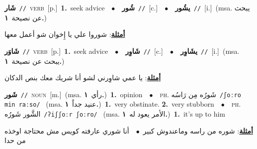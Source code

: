\documentclass[10pt,a4paper,twoside]{article} %
\begin{document}
\begin{multicols}{2}
{\setlength\topsep{0pt}\textbf{\foreignlanguage{arabic}{شَار}}\ {\color{gray}\texttt{//}\color{black}}\ \textsc{verb}\ [p.]\ \textbf{1.}~seek advice\ \ $\bullet$\ \ \setlength\topsep{0pt}\textbf{\foreignlanguage{arabic}{شُور}}\ {\color{gray}\texttt{//}\color{black}}\ [c.]\ \ $\bullet$\ \ \setlength\topsep{0pt}\textbf{\foreignlanguage{arabic}{يشُور}}\ {\color{gray}\texttt{//}\color{black}}\ [i.]\ \color{gray}(msa. \foreignlanguage{arabic}{يبحث عن نصيحة}~\foreignlanguage{arabic}{\textbf{١.}})\color{black}\  \begin{flushright}\color{gray}\foreignlanguage{arabic}{\textbf{\underline{\foreignlanguage{arabic}{أمثلة}}}: شوروا علي يا إِخوان شو أعمل معها}\end{flushright}\color{black}} \vspace{2mm}

{\setlength\topsep{0pt}\textbf{\foreignlanguage{arabic}{شَاوَر}}\ {\color{gray}\texttt{//}\color{black}}\ \textsc{verb}\ [p.]\ \textbf{1.}~seek advice\ \ $\bullet$\ \ \setlength\topsep{0pt}\textbf{\foreignlanguage{arabic}{شَاوِر}}\ {\color{gray}\texttt{//}\color{black}}\ [c.]\ \ $\bullet$\ \ \setlength\topsep{0pt}\textbf{\foreignlanguage{arabic}{يشَاوِر}}\ {\color{gray}\texttt{//}\color{black}}\ [i.]\ \color{gray}(msa. \foreignlanguage{arabic}{يبحث عن نصيحة}~\foreignlanguage{arabic}{\textbf{١.}})\color{black}\  \begin{flushright}\color{gray}\foreignlanguage{arabic}{\textbf{\underline{\foreignlanguage{arabic}{أمثلة}}}: يا عمي شاوِرني لشو أنا شريك معك بنص الدكان}\end{flushright}\color{black}} \vspace{2mm}

{\setlength\topsep{0pt}\textbf{\foreignlanguage{arabic}{شَور}}\ {\color{gray}\texttt{//}\color{black}}\ \textsc{noun}\ [m.]\ \color{gray}(msa. \foreignlanguage{arabic}{رأي}~\foreignlanguage{arabic}{\textbf{١.}})\color{black}\ \textbf{1.}~opinion\ \ $\bullet$\ \ \textsc{ph.} \color{gray} \foreignlanguage{arabic}{شَورُه مِن رَاسُه}\color{black}\ {\color{gray}\texttt{/{\sffamily ʃoːro min raːso}/}\color{black}}\ \color{gray} (msa. \foreignlanguage{arabic}{عنيد جداً}~\foreignlanguage{arabic}{\textbf{١.}})\color{black}\ \textbf{1.}~very obstinate.  \textbf{2.}~very stubborn\ \ $\bullet$\ \ \textsc{ph.} \color{gray} \foreignlanguage{arabic}{الشَّور شَورُه}\color{black}\ {\color{gray}\texttt{/{\sffamily ʔiʃʃoːr ʃoːro}/}\color{black}}\ \color{gray} (msa. \foreignlanguage{arabic}{الأمر يعود له}~\foreignlanguage{arabic}{\textbf{١.}})\color{black}\ \textbf{1.}~it's up to him\  \begin{flushright}\color{gray}\foreignlanguage{arabic}{\textbf{\underline{\foreignlanguage{arabic}{أمثلة}}}: شوره من راسه وماعندوش كبير\ $\bullet$\ \  أنا شوري عارفته كويس مش محتاجة اوخذه من حدا}\end{flushright}\color{black}} \vspace{2mm}


\end{multicols}
\end{document}
